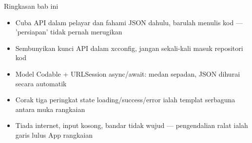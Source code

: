 \begin{tcbsummary}{Ringkasan bab ini}
\begin{itemize}
  \item Cuba API dalam pelayar dan fahami JSON dahulu, barulah menulis kod — 'persiapan' tidak pernah merugikan
  \item Sembunyikan kunci API dalam xcconfig, jangan sekali-kali masuk repositori kod
  \item Model Codable + URLSession async/await: medan sepadan, JSON dihurai secara automatik
  \item Corak tiga peringkat state loading/success/error ialah templat serbaguna antara muka rangkaian
  \item Tiada internet, input kosong, bandar tidak wujud — pengendalian ralat ialah garis lulus App rangkaian
\end{itemize}

\end{tcbsummary}
